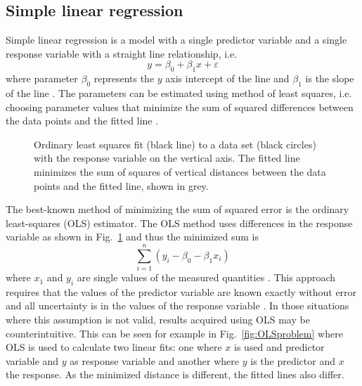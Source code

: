 \documentclass[english, oneside]{HYgradu}
\begin{document}
\subsection{Simple linear regression}\label{sect:simple-linear}
Simple linear regression is a model with a single predictor variable and a single response variable with a straight line relationship, i.e.
\begin{equation}
	y = \beta_0 + \beta_1 x + \varepsilon
\end{equation}
where parameter $\beta_0$ represents the $y$ axis intercept of the line and $\beta_1$ is the slope of the line \citep{montgomery2012introduction}. The parameters can be estimated using method of least squares, i.e. choosing parameter values that minimize the sum of squared differences between the data points and the fitted line \citep{montgomery2012introduction}. 

\begin{figure}
    \centering
    
    \caption{Ordinary least squares fit (black line) to a data set (black circles) with the response variable on the vertical axis. The fitted line minimizes the sum of squares of vertical distances between the data points and the fitted line, shown in grey.}\label{fig:OLS}
\end{figure}

The best-known method of minimizing the sum of squared error is the ordinary least-squares (OLS) estimator. The OLS method uses differences in the response variable as shown in Fig.\ \ref{fig:OLS} and thus the minimized sum is
\begin{equation}
	\sum_{i=1}^n (y_i - \beta_0 - \beta_1 x_i)
\end{equation}
where $x_1$ and $y_i$ are single values of the measured quantities \citep{feigelson2012modern}. This approach requires that the values of the predictor variable are known exactly without error and all uncertainty is in the values of the response variable \citep{feigelson2012modern}. In those situations where this assumption is not valid, results acquired using OLS may be counterintuitive. This can be seen for example in Fig.\ \ref{fig:OLSproblem} where OLS is used to calculate two linear fits: one where $x$ is used and predictor variable and $y$ as response variable and another where $y$ is the predictor and $x$ the response. As the minimized distance is different, the fitted lines also differ.
\end{document}
